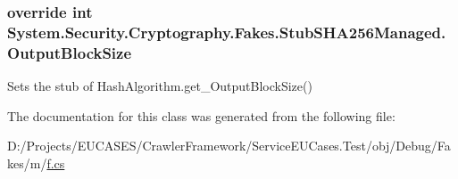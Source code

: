 \hypertarget{class_system_1_1_security_1_1_cryptography_1_1_fakes_1_1_stub_s_h_a256_managed_a9b8f6b31ef057fd2b3fc71e801b0f4ad}{
\subsubsection[{Output\-Block\-Size}]{\setlength{\rightskip}{0pt plus 5cm}override int System.\-Security.\-Cryptography.\-Fakes.\-Stub\-S\-H\-A256\-Managed.\-Output\-Block\-Size\hspace{0.3cm}{\ttfamily [get]}}}\label{class_system_1_1_security_1_1_cryptography_1_1_fakes_1_1_stub_s_h_a256_managed_a9b8f6b31ef057fd2b3fc71e801b0f4ad}


Sets the stub of Hash\-Algorithm.\-get\-\_\-\-Output\-Block\-Size()



The documentation for this class was generated from the following file\-:\begin{DoxyCompactItemize}
\item 
D\-:/\-Projects/\-E\-U\-C\-A\-S\-E\-S/\-Crawler\-Framework/\-Service\-E\-U\-Cases.\-Test/obj/\-Debug/\-Fakes/m/\hyperlink{m_2f_8cs}{f.\-cs}\end{DoxyCompactItemize}

